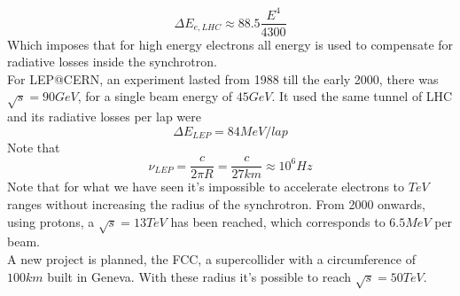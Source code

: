 \documentclass[../qm.tex]{subfiles}
\begin{document}
\begin{equation}
	\Delta E_{e,LHC}\approx88.5\frac{E^4}{4300}
	\label{eq:energylosslhce}
\end{equation}
Which imposes that for high energy electrons all energy is used to compensate for radiative losses inside the synchrotron.\\
For LEP@CERN, an experiment lasted from 1988 till the early 2000, there was $\sqrt{s}=90\unit{GeV}$, for a single beam energy of $45\unit{GeV}$. It used the same tunnel of LHC and its radiative losses per lap were
\begin{equation*}
	\Delta E_{LEP}=84\unit{MeV/lap}
\end{equation*}
Note that
\begin{equation*}
	\nu_{LEP}=\frac{c}{2\pi R}=\frac{c}{27\unit{km}}\approx10^6\unit{Hz}
\end{equation*}
Note that for what we have seen it's impossible to accelerate electrons to $\unit{TeV}$ ranges without increasing the radius of the synchrotron. From 2000 onwards, using protons, a $\sqrt{s}=13\unit{TeV}$ has been reached, which corresponds to $6.5\unit{MeV}$ per beam.\\
A new project is planned, the FCC, a supercollider with a circumference of $100\unit{km}$ built in Geneva. With these radius it's possible to reach $\sqrt{s}=50\unit{TeV}$.
\end{document}
